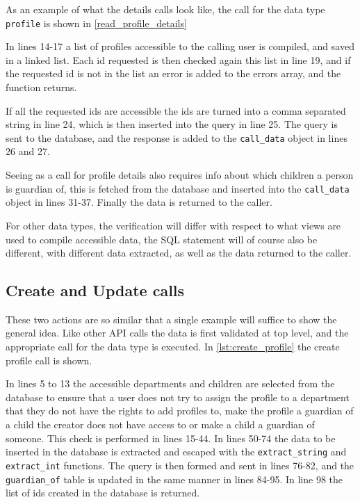 As an example of what the details calls look like, the call for the data type \lstinline|profile| is shown in \autoref{read_profile_details}



In lines 14-17 a list of profiles accessible to the calling user is compiled, and saved in a linked list. Each id requested is then checked again this list in line 19, and if the requested id is not in the list an error is added to the errors array, and the function returns.

If all the requested ids are accessible the ids are turned into a comma separated string in line 24, which is then inserted into the query in line 25. The query is sent to the database, and the response is added to the \lstinline|call_data| object in lines 26 and 27.

Seeing as a call for profile details also requires info about which children a person is guardian of, this is fetched from the database and inserted into the \lstinline|call_data| object in lines 31-37. Finally the data is returned to the caller.

For other data types, the verification will differ with respect to what views are used to compile accessible data, the SQL statement will of course also be different, with different data extracted, as well as the data returned to the caller.

\subsection{Create and Update calls}
These two actions are so similar that a single example will suffice to show the general idea. Like other API calls the data is first validated at top level, and the appropriate call for the data type is executed. In \autoref{lst:create_profile} the create profile call is shown.



In lines 5 to 13 the accessible departments and children are selected from the database to ensure that a user does not try to assign the profile to a department that they do not have the rights to add profiles to, make the profile a guardian of a child the creator does not have access to or make a child a guardian of someone. This check is performed in lines 15-44. In lines 50-74 the data to be inserted in the database is extracted and escaped with the \lstinline|extract_string| and \lstinline|extract_int| functions. The query is then formed and sent in lines 76-82, and the \lstinline|guardian_of| table is updated in the same manner in lines 84-95. In line 98 the list of ids created in the database is returned.


